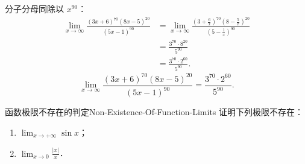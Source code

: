 \begin{solution}

    分子分母同除以 $x^{90}$：
    \begin{equation}
        \begin{aligned}
            \lim_{x\to\infty} \frac{(3x+6)^{70}(8x-5)^{20}}{(5x-1)^{90}} & = \lim_{x\to\infty} \frac{\left(3 + \frac{6}{x}\right)^{70} \left(8 - \frac{5}{x}\right)^{20}}{\left(5 - \frac{1}{x}\right)^{90}} \\
                                                                         & = \frac{3^{70} \cdot 8^{20}}{5^{90}}                                                                                              \\
                                                                         & = \frac{3^{70} \cdot 2^{60}}{5^{90}}.
        \end{aligned}
    \end{equation}
    \begin{equation}
        \boxed{\lim_{x\to\infty} \frac{(3x+6)^{70}(8x-5)^{20}}{(5x-1)^{90}} = \frac{3^{70} \cdot 2^{60}}{5^{90}}.}
    \end{equation}
\end{solution}

\begin{problem}{函数极限不存在的判定}{Non-Existence-Of-Function-Limits}
    证明下列极限不存在：
    \begin{enumerate}
        \item $\lim_{x\to +\infty} \sin x$；
        \item $\lim_{x\to 0} \frac{|x|}{x}$．
    \end{enumerate}
\end{problem}

